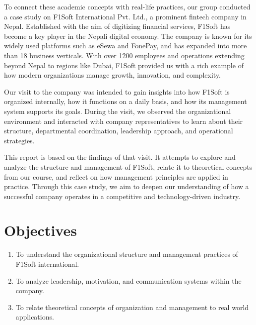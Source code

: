 \documentclass[12pt, a4paper]{report}
\begin{document}
To connect these academic concepts with real-life practices, our group conducted a case study on F1Soft International Pvt. Ltd., a prominent fintech company in Nepal. Established with the aim of digitizing financial services, F1Soft has become a key player in the Nepali digital economy. The company is known for its widely used platforms such as eSewa and FonePay, and has expanded into more than 18 business verticals. With over 1200 employees and operations extending beyond Nepal to regions like Dubai, F1Soft provided us with a rich example of how modern organizations manage growth, innovation, and complexity.

Our visit to the company was intended to gain insights into how F1Soft is organized internally, how it functions on a daily basis, and how its management system supports its goals. During the visit, we observed the organizational environment and interacted with company representatives to learn about their structure, departmental coordination, leadership approach, and operational strategies.

This report is based on the findings of that visit. It attempts to explore and analyze the structure and management of F1Soft, relate it to theoretical concepts from our course, and reflect on how management principles are applied in practice. Through this case study, we aim to deepen our understanding of how a successful company operates in a competitive and technology-driven industry.

\section{Objectives}
\begin{enumerate}
    \item To understand the organizational structure and management practices of F1Soft international.
    \item To analyze leadership, motivation, and communication systems within the company.
    \item To relate theoretical concepts of organization and management to real world applications.
\end{enumerate}
\end{document}
